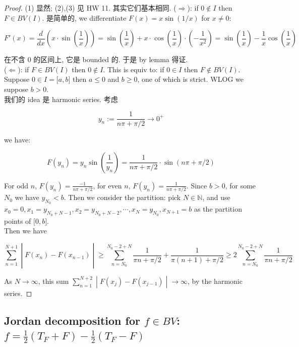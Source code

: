 \documentclass{qlnotes-export}
\begin{document}
\begin{proof}

(1) 显然; (2),(3) 见 HW 11. 其实它们基本相同. (\(\Longrightarrow\)): if \(0 \notin I\) then \(F \in BV(I)\). 是简单的, we differentiate \(F(x) = x\sin(1/x)\) for \(x \neq 0\):

\[F'(x) = \frac{d}{dx}\left( {x \cdot \sin\left( \frac{1}{x} \right)} \right) = \sin\left( \frac{1}{x} \right) + x \cdot \cos\left( \frac{1}{x} \right) \cdot \left( {- \frac{1}{x^{2}}} \right) = \sin\left( \frac{1}{x} \right) - \frac{1}{x}\cos\left( \frac{1}{x} \right)\]

在不含 \(0\) 的区间上, 它是 bounded 的. 于是 by lemma 得证.\\
(\(\Longleftarrow\)): if \(F \in BV(I)\) then \(0 \notin I\). This is equiv to: if \(0 \in I\) then \(F \notin BV(I)\).\\
Suppose \(0 \in I = \lbrack a,b\rbrack\) then \(a \leq 0\) and \(b \geq 0\), one of which is strict. WLOG we suppose \(b > 0\).\\
我们的 idea 是 harmonic series. 考虑

\[y_{n} := \frac{1}{n\pi + \pi/2}\rightarrow 0^{+}\]

we have:

\[F\left( y_{n} \right) = y_{n}\sin\left( \frac{1}{y_{n}} \right) = \frac{1}{n\pi + \pi/2} \cdot \sin(n\pi + \pi/2)\]

For odd \(n\), \(F(y_{n}) = \frac{- 1}{n\pi + \pi/2}\), for even \(n\), \(F(y_{n}) = \frac{1}{n\pi + \pi/2}\). Since \(b > 0\), for some \(N_{0}\) we have \(y_{N_{0}} < b\). Then we consider the partition: pick \(N \in {\mathbb{N}}\), and use \(x_{0} = 0,x_{1} = y_{N_{0} + N - 1},x_{2} = y_{N_{0} + N - 2},\cdots,x_{N} = y_{N_{0}},x_{N + 1} = b\) as the partition points of \(\lbrack 0,b\rbrack\).\\
Then we have

\[\left. \sum\limits_{n = 1}^{N + 1} \middle| F(x_{n}) - F(x_{n - 1}) \middle| \geq \sum\limits_{n = N_{0}}^{N_{0} - 2 + N}\frac{1}{\pi n + \pi/2} + \frac{1}{\pi(n + 1) + \pi/2} \geq 2\sum\limits_{n = N_{0}}^{N_{0} - 2 + N}\frac{1}{\pi n + \pi/2} \right.\]

As \(N\rightarrow\infty\), this sum \(\left. \sum_{n = 1}^{N + 2} \middle| F(x_{j}) - F(x_{j - 1}) \middle| \rightarrow\infty \right.\), by the harmonic series.

\end{proof}

\subsection{\texorpdfstring{Jordan decomposition for \(f \in BV\): \(f = \frac{1}{2}(T_{F} + F) - \frac{1}{2}(T_{F} - F)\)}{Jordan decomposition for f \textbackslash in BV: f = \textbackslash frac\{1\}\{2\}(T\_\{F\} + F) - \textbackslash frac\{1\}\{2\}(T\_\{F\} - F)}}\label{jordan-decomposition-for-f-in-bv-f-frac12t_f-f---frac12t_f---f}
\end{document}
